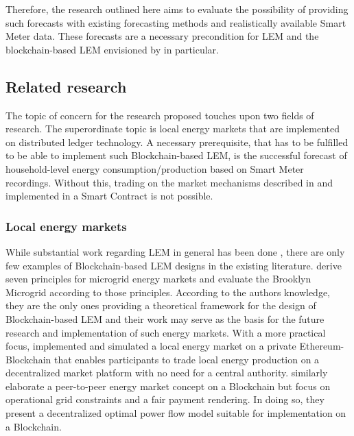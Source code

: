Therefore, the research outlined here aims to evaluate the possibility of providing such forecasts with existing forecasting methods and realistically available Smart Meter data. These forecasts are a necessary precondition for LEM and the blockchain-based LEM envisioned by \citet{Mengelkamp:2018a} in particular.


\subsection{Related research}\label{Sec:Intro;Subsec:Related}
The topic of concern for the research proposed touches upon two fields of research. The superordinate topic is local energy markets that are implemented on distributed ledger technology. A necessary prerequisite, that has to be fulfilled to be able to implement such Blockchain-based LEM, is the successful forecast of household-level energy consumption/production based on Smart Meter recordings. Without this, trading on the market mechanisms described in \citet{Block:xxxx} and implemented in a Smart Contract \citet{Mengelkamp:2018a} is not possible.


\subsubsection{Local energy markets}
While substantial work regarding LEM in general has been done \citep[e.g.,][]{Lamparter:xxxx,Li:2015, Mihaylov:xxxx}, there are only few examples of Blockchain-based LEM designs in the existing literature. 
\citet{Mengelkamp:2018b} derive seven principles for microgrid energy markets and evaluate the Brooklyn Microgrid according to those principles. According to the authors knowledge, they are the only ones providing a theoretical framework for the design of Blockchain-based LEM and their work may serve as the basis for the future research and implementation of such energy markets.
With a more practical focus, \citet{Mengelkamp:2018a} implemented and simulated a local energy market on a private Ethereum-Blockchain  that enables participants to trade local energy production on a decentralized market platform with no need for a central authority.
\citet{Münsing:xxxx} similarly elaborate a peer-to-peer energy market concept on a Blockchain but focus on operational grid constraints and a fair payment rendering. In doing so, they present a decentralized optimal power flow model suitable for implementation on a Blockchain.



